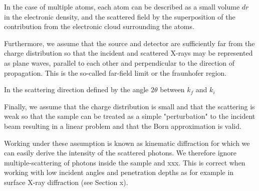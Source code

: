 In the case of multiple atoms, each atom can be described as a small volume $dr$ in the electronic density, and the scattered field by the superposition of the contribution from the electronic cloud surrounding the atoms.















Furthermore, we assume that the source and detector are sufficiently far from the charge distribution so that the incident and scattered X-rays may be represented as plane waves, parallel to each other and perpendicular to the direction of propagation. %
This is the so-called far-field limit or the fraunhofer region.

In the scattering direction defined by the angle $2\theta$ between $k_f$ and $k_i$


Finally, we assume that the charge distribution is small and that the scattering is weak so that the sample can be treated as a simple "perturbation" to the incident beam resulting in a linear problem \parencite{NielsenMcMorrow} and that the Born approximation is valid.

Working under these assumption is known as kinematic diffraction for which we can easily derive the intensity of the scattered photons. We therefore ignore multiple-scattering of photons inside the sample and xxx. This is correct when working with low incident angles and penetration depths as for example in surface X-ray diffraction (see Section x).




